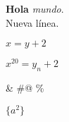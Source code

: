 \documentclass{book}
\begin{document}
  




{{\bf Hola} \it mundo}. \\ Nueva línea.


$x = y + 2$

$x^{20} = y_n + 2$


\verb@ {} & #@ \%

$\{ a^2 \}$
\end{document}
